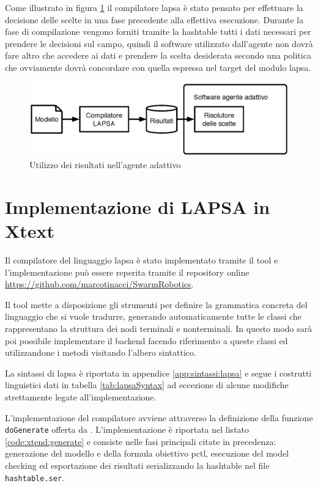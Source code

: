 Come illustrato in figura \ref{fig:lapsa:compiler2} il compilatore \ac{lapsa} è stato pensato per effettuare la decisione delle scelte in una fase precedente alla effettiva esecuzione. Durante la fase di compilazione vengono forniti tramite la hashtable tutti i dati necessari per prendere le decisioni sul campo, quindi il software utilizzato dall'agente non dovrà fare altro che accedere ai dati e prendere la scelta desiderata secondo una politica che ovviamente dovrà concordare con quella espressa nel target del modulo \ac{lapsa}.

\begin{figure}[htbp!]
	\begin{centering}
		\includegraphics[width=\textwidth]{Images/lapsa2}
	\end{centering}
	\caption{Utilizzo dei risultati nell'agente adattivo}
	\label{fig:lapsa:compiler2}
\end{figure}

\section{Implementazione di LAPSA in Xtext}%
Il compilatore del linguaggio \ac{lapsa} è stato implementato tramite il tool \xtext{} \cite{xtext} e l'implementazione può essere reperita tramite il repository online \url{https://github.com/marcotinacci/SwarmRobotics}.

Il tool mette a disposizione gli strumenti per definire la grammatica concreta del linguaggio che si vuole tradurre, generando automaticamente tutte le classi \java{} che rappresentano la struttura dei nodi terminali e nonterminali. In questo modo sarà poi possibile implementare il backend facendo riferimento a queste classi ed utilizzandone i metodi visitando l'albero sintattico. 

La sintassi di \ac{lapsa} è riportata in appendice \ref{app:sintassi:lapsa} e segue i costrutti linguistici dati in tabella \ref{tab:lapsaSyntax} ad eccezione di alcune modifiche strettamente legate all'implementazione.

L'implementazione del compilatore avviene attraverso la definizione della funzione \texttt{doGenerate} offerta da \xtext{}. L'implementazione è riportata nel listato \ref{code:xtend:generate} e consiste nelle fasi principali citate in precedenza: generazione del modello \prism{} e della formula obiettivo \ac{pctl}, esecuzione del model checking ed esportazione dei risultati serializzando la hashtable nel file \texttt{hashtable.ser}.

